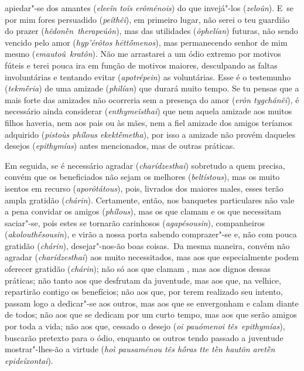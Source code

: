 apiedar"-se dos amantes (\emph{eleeîn toîs erôménois}) do que invejá"-los
(\emph{zeloûn}). E~se por mim fores persuadido (\emph{peíthêi}), em
primeiro lugar, não serei o teu guardião do prazer
(\emph{hêdonḕn}~\emph{therapeúôn}), mas das utilidades (\emph{ôphelían})
futuras, \bekker{[233c]} não sendo vencido pelo amor (\emph{hyp'érôtos
hēttṓmenos}), mas permanecendo senhor de mim mesmo
(\emph{emautoû}~\emph{kratôn}). Não me arrastarei a um ódio extremo por
motivos fúteis e terei pouca ira em função de motivos maiores,
desculpando as faltas involuntárias e tentando evitar
(\emph{apotrépein}) as voluntárias. Esse é o testemunho
(\emph{tekmḗria}) de uma amizade (\emph{philían}) que durará muito
tempo. Se tu pensas que a mais forte das amizades não ocorreria sem a
presença do amor (\emph{erôn tygchánêi}), \bekker{[233d]} é necessário ainda
considerar (\emph{enthymeîsthai}) que nem aquela amizade aos muitos
filhos haveria, nem aos pais ou às mães, nem a fiel amizade dos amigos
teríamos adquirido (\emph{pistoùs phílous ekektḗmetha}), por isso a
amizade não provém daqueles desejos (\emph{epithymías}) antes
mencionados, mas de outras práticas.

Em seguida, se é necessário agradar (\emph{charídzesthai}) sobretudo a
quem precisa, convém que os beneficiados não sejam os melhores
(\emph{beltístous}), mas os muito isentos em recurso
(\emph{aporôtátous}), pois, livrados dos maiores males, esses terão
ampla gratidão (\emph{chárin}). Certamente, então, nos banquetes
particulares não vale a pena convidar os amigos (\emph{phílous}), mas os
que clamam e os que necessitam saciar"-se, pois estes se tornarão
carinhosos (\emph{agapésousin}), companheiros (\emph{akolouthḗsousin}),
e virão a nossa porta sabendo comprazer"-se e, não com pouca gratidão
(\emph{chárin}), desejar"-nos-ão boas coisas.~Da mesma maneira, convém
não agradar (\emph{charídzesthai}) aos muito necessitados, mas aos que
especialmente podem oferecer gratidão (\emph{chárin}); não só aos que
clamam \bekker{[234a]}, mas aos dignos dessas práticas; não tanto aos que
desfrutam da juventude, mas aos que, na velhice, repartirão contigo os
benefícios; não aos que, por terem realizado seu intento, passam logo a
dedicar"-se aos outros, mas aos que se envergonham e calam diante de
todos; não aos que se dedicam por um curto tempo, mas aos que serão
amigos por toda a vida; não aos que, cessado o desejo (\emph{oi
pauómenoi tês~epithymías}), buscarão pretexto para o ódio, enquanto os
outros tendo \bekker{[234b]} passado a juventude mostrar"-lhes-ão a virtude
(\emph{hoì pausaménou tês hṓras tte tḕn hautõn aretḕn epideíxontai}).

